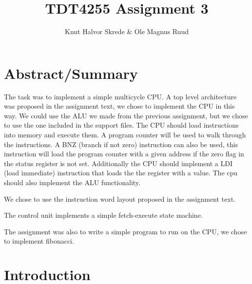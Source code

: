 \documentclass[11pt]{report}
\title{TDT4255 Assignment 3}
\author{Knut Halvor Skrede \& Ole Magnus Ruud}
\begin{document}
\maketitle
\clearpage


\section*{Abstract/Summary}
        

The task was to implement a simple multicycle CPU. A top level architecture 
was proposed in the assignment text, we chose to implement the CPU in this way. 
We could use the ALU we made from the previous assignment, but we chose to use
the one included in the support files. The CPU should load instructions into 
memory and execute them. A program counter will be used to walk through the 
instructions. A BNZ (branch if not zero) instruction can also be used, this 
instruction will load the program counter with a given address if the zero flag
in the status register is not set. Additionally the CPU should implement a 
LDI (load immediate) instruction that loads the the register with a value. 
The cpu should also implement the ALU functionality.

We chose to use the instruction word layout proposed in the assignment text.

The control unit implements a simple fetch-execute state machine.

The assignment was also to write a simple program to run on the CPU, 
we chose to implement fibonacci.

\section*{Introduction}

\end{document}
